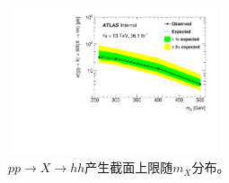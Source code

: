 \begin{figure}[!h!tpb]
  \centering
  \includegraphics[width=0.55\textwidth, angle=-90]{fig/Statistical/limitAllSys.pdf}
  \caption{$pp\rightarrow X \rightarrow hh$产生截面上限随$m_X$分布。}
\label{fig:limit_plots_2lss}
\end{figure}

